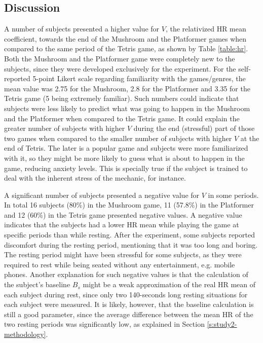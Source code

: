 \subsection{Discussion}

A number of subjects presented a higher value for $V$, the relativized HR mean coefficient, towards the end of the Mushroom and the Platformer games when compared to the same period of the Tetris game, as shown by Table \ref{table:hr}. Both the Mushroom and the Platformer game were completely new to the subjects, since they were developed exclusively for the experiment. For the self-reported 5-point Likert scale regarding familiarity with the games/genres, the mean value was 2.75 for the Mushroom, 2.8 for the Platformer and 3.35 for the Tetris game (5 being extremely familiar). Such numbers could indicate that subjects were less likely to predict what was going to happen in the Mushroom and the Platformer when compared to the Tetris game. It could explain the greater number of subjects with higher $V$ during the end (stressful) part of those two games when compared to the smaller number of subjects with higher $V$ at the end of Tetris. The later is a popular game and subjects were more familiarized with it, so they might be more likely to guess what is about to happen in the game, reducing anxiety levels. This is specially true if the subject is trained to deal with the inherent stress of the mechanic, for instance.

A significant number of subjects presented a negative value for $V$ in some periods. In total 16 subjects (80\%) in the Mushroom game, 11 (57.8\%) in the Platformer and 12 (60\%) in the Tetris game presented negative values. A negative value indicates that the subjects had a lower HR mean while playing the game at specific periods than while resting. After the experiment, some subjects reported discomfort during the resting period, mentioning that it was too long and boring. The resting period might have been stressful for some subjects, as they were required to rest while being seated without any entertainment, e.g. mobile phones. Another explanation for such negative values is that the calculation of the subject's baseline $B_s$ might be a weak approximation of the real HR mean of each subject during rest, since only two 140-seconds long resting situations for each subject were measured. It is likely, however, that the baseline calculation is still a good parameter, since the average difference between the mean HR of the two resting periods was significantly low, as explained in Section \ref{s:study2-methodology}.

